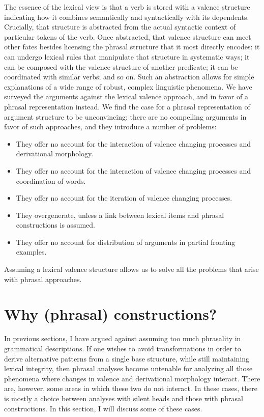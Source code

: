 \begin{exe}
\begin{xlist}[iv.]
\begin{exe}
\begin{xlist}[iv.]
The essence of the lexical view is that a verb is stored with a valence structure indicating how it
combines semantically and syntactically with its dependents.  Crucially, that structure is
abstracted from the actual syntactic context of particular tokens of the verb.  Once abstracted,
that valence structure can meet other fates besides licensing the phrasal structure that it most
directly encodes: it can undergo lexical rules that manipulate that structure in systematic ways; it
can be composed with the valence structure of another predicate; it can be coordinated with similar
verbs; and so on.  Such an abstraction allows for simple explanations of a wide range of
robust, complex linguistic phenomena.  We have surveyed the arguments against the lexical valence
approach, and in favor of a phrasal representation instead.  We find the case for a phrasal
representation of argument structure to be unconvincing: there are no compelling arguments in favor
of such approaches, and they introduce a number of problems:
\begin{itemize}
\item They offer no account for the interaction of valence changing processes and derivational morphology.
\item They offer no account for the interaction of valence changing processes and coordination of words.
\item They offer no account for the iteration of valence changing processes.
\item They overgenerate, unless a link between lexical items and phrasal constructions is assumed.
\item They offer no account for distribution of arguments in partial fronting examples.
\end{itemize}
Assuming a lexical valence structure
allows us to solve all the problems that arise with phrasal approaches.



\section{Why (phrasal) constructions?}
\label{Abschnitt-Phrasale-Konstruktionen}\label{sec-why-phrasal}

In previous sections, I have argued against assuming too much phrasality in grammatical descriptions.
If one wishes to avoid transformations in order to derive alternative patterns from a single base structure, while still maintaining lexical integrity,
then phrasal analyses become untenable for analyzing all those phenomena where changes in valence and derivational morphology interact. There are, however, some areas
in which these two do not interact. In these cases, there is mostly a choice between analyses with silent heads and those with phrasal constructions. In this section,
I will discuss some of these cases.


\end{xlist}
\end{exe}
\end{xlist}
\end{exe}
